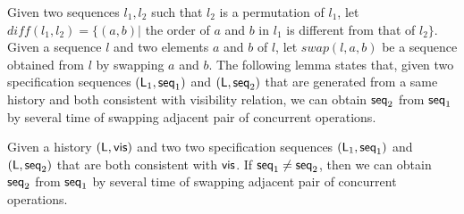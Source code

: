 Given two sequences $l_1,l_2$  such that $l_2$ is a permutation of $l_1$, let $\mathit{diff}(l_1,l_2) = \{ (a,b) \vert$ the order of $a$ and $b$ in $l_1$ is different from that of $l_2 \}$. Given a sequence $l$ and two elements $a$ and $b$ of $l$, let $\mathit{swap}(l,a,b)$ be a sequence obtained from $l$ by swapping $a$ and $b$. The following lemma states that, given two specification sequences $(\mathsf{L}_1, \mathsf{seq}_1)$ and $(\mathsf{L}, \mathsf{seq}_2)$ that are generated from a same history and both consistent with visibility relation, we can obtain $\mathsf{seq}_2$ from $\mathsf{seq}_1$ by several time of swapping adjacent pair of concurrent operations.

\begin{lemma}
\label{lemma:given two sequence consistent with visibility order, one can be obtained from the other}
Given a history $(\mathsf{L},\mathsf{vis})$ and two two specification sequences $(\mathsf{L}_1, \mathsf{seq}_1)$ and $(\mathsf{L}, \mathsf{seq}_2)$ that are both consistent with $\mathsf{vis}$. If $\mathsf{seq}_1 \neq \mathsf{seq}_2$, then we can obtain $\mathsf{seq}_2$ from $\mathsf{seq}_1$ by several time of swapping adjacent pair of concurrent operations.
\end{lemma}

